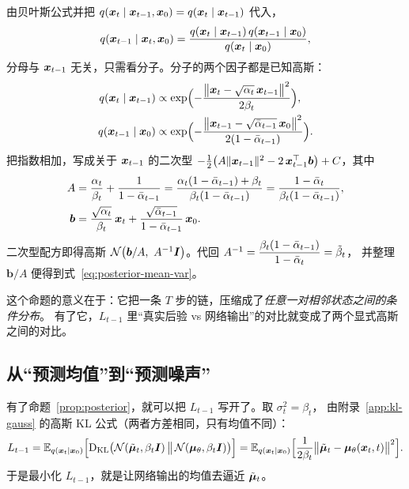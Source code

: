 \begin{pf}
由贝叶斯公式并把 $q(\bm{x}_t\mid\bm{x}_{t-1},\bm{x}_0)=q(\bm{x}_t\mid\bm{x}_{t-1})$ 代入，
\begin{equation}
  q(\bm{x}_{t-1}\mid\bm{x}_t,\bm{x}_0)
  =\frac{q(\bm{x}_t\mid\bm{x}_{t-1})\,q(\bm{x}_{t-1}\mid\bm{x}_0)}{q(\bm{x}_t\mid\bm{x}_0)} ,
  \label{eq:posterior-bayes}
\end{equation}
分母与 $\bm{x}_{t-1}$ 无关，只需看分子。分子的两个因子都是已知高斯：
\begin{equation}
  \begin{aligned}
    q(\bm{x}_t\mid\bm{x}_{t-1})
    &\propto \exp\Bigl(-\frac{\bigl\|\bm{x}_t-\sqrt{\alpha_t}\,\bm{x}_{t-1}\bigr\|^2}{2\beta_t}\Bigr), \\
    q(\bm{x}_{t-1}\mid\bm{x}_0)
    &\propto \exp\Bigl(-\frac{\bigl\|\bm{x}_{t-1}-\sqrt{\bar\alpha_{t-1}}\,\bm{x}_0\bigr\|^2}{2(1-\bar\alpha_{t-1})}\Bigr).
  \end{aligned}
  \label{eq:posterior-factors}
\end{equation}
把指数相加，写成关于 $\bm{x}_{t-1}$ 的二次型
$-\frac{1}{2}\bigl(A\|\bm{x}_{t-1}\|^2-2\,\bm{x}_{t-1}^{\top}\bm{b}\bigr)+C$，其中
\begin{equation}
  \begin{aligned}
    A&=\frac{\alpha_t}{\beta_t}+\frac{1}{1-\bar\alpha_{t-1}}
     =\frac{\alpha_t(1-\bar\alpha_{t-1})+\beta_t}{\beta_t(1-\bar\alpha_{t-1})}
     =\frac{1-\bar{\alpha}_t}{\beta_t(1-\bar\alpha_{t-1})}, \\
    \bm{b}&=\frac{\sqrt{\alpha_t}}{\beta_t}\,\bm{x}_t
     +\frac{\sqrt{\bar\alpha_{t-1}}}{1-\bar\alpha_{t-1}}\,\bm{x}_0 .
  \end{aligned}
  \label{eq:posterior-ab}
\end{equation}
二次型配方即得高斯 $\mathcal{N}\bigl(\bm{b}/A,\ A^{-1}\bm{I}\bigr)$。代回
$A^{-1}=\dfrac{\beta_t(1-\bar\alpha_{t-1})}{1-\bar{\alpha}_t}=\tilde\beta_t$，
并整理 $\bm{b}/A$ 便得到式~\eqref{eq:posterior-mean-var}。
\end{pf}

这个命题的意义在于：它把一条 $T$ 步的链，压缩成了\emph{任意一对相邻状态之间的条件分布}。
有了它，$L_{t-1}$ 里“真实后验 vs 网络输出”的对比就变成了两个显式高斯之间的对比。

\subsection{从“预测均值”到“预测噪声”}

有了命题~\ref{prop:posterior}，就可以把 $L_{t-1}$ 写开了。取 $\sigma_t^2=\beta_t$，
由附录~\ref{app:kl-gauss} 的高斯 KL 公式（两者方差相同，只有均值不同）：
\begin{equation}
  L_{t-1}
  =\mathbb{E}_{q(\bm{x}_t\mid\bm{x}_0)}\Bigl[\mathrm{D}_{\mathrm{KL}}\bigl(\mathcal{N}(\tilde{\bm{\mu}}_t,\beta_t\bm{I})\,\big\|\,\mathcal{N}(\bm{\mu}_\theta,\beta_t\bm{I})\bigr)\Bigr]
  =\mathbb{E}_{q(\bm{x}_t\mid\bm{x}_0)}\Bigl[\frac{1}{2\beta_t}\bigl\|\tilde{\bm{\mu}}_t-\bm{\mu}_\theta(\bm{x}_t,t)\bigr\|^2\Bigr].
  \label{eq:Lt-kl}
\end{equation}
于是最小化 $L_{t-1}$，就是让网络输出的均值去逼近 $\tilde{\bm{\mu}}_t$。

